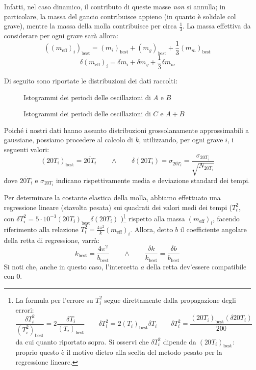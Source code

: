 \documentclass{article}
\newcommand*{\best}[1]{{#1}_\text{best}}
\begin{document}
Infatti, nel caso dinamico, il contributo di queste masse
\emph{non} si annulla; in particolare, la massa del gancio
contribuisce appieno (in quanto è solidale col grave),
mentre la massa della molla contribuisce per circa
$\frac{1}{3}$. La massa effettiva da considerare per ogni grave
sarà allora:
\[\best{\left(\left(m_\text{eff}\right)_i\right)} = \best{\left(m_i\right)} + \best{\left(m_g\right)} + \frac{1}{3}\best{\left(m_m\right)}\]
\[\delta \left(m_\text{eff}\right)_i = \delta m_i + \delta m_g + \frac{1}{3}\delta m_m\]

Di seguito sono riportate le distribuzioni dei dati raccolti:

\begin{figure}[H]
    \caption{Istogrammi dei periodi delle oscillazioni di $A$ e $B$}
\end{figure}\begin{figure}[H]
    \caption{Istogrammi dei periodi delle oscillazioni di $C$ e $A+B$}
\end{figure}

Poiché i nostri dati hanno assunto distribuzioni grossolanamente
approssimabili a gaussiane, possiamo procedere al calcolo di $k$,
utilizzando, per ogni grave $i$, i seguenti valori:
\[
    \left(20T_i\right)_\text{best} = \overline{20T_i}
    \qquad\wedge\qquad
    \delta\left(20T_i\right) =
    \sigma_{\overline{20T_i}} =
    \frac{\sigma_{20T_i}}{\sqrt{N_{20T_i}}}
\]
dove $\overline{20T_i}$ e $\sigma_{20T_i}$ indicano rispettivamente
media e deviazione standard dei tempi.

Per determinare la costante elastica della molla, abbiamo effettuato
una regressione lineare (stavolta pesata) sui quadrati dei valori medi
dei tempi ($T_i^2$, con
$\delta T_i^2 = 5 \cdot 10^{-3} (20 T_i)_\text{best} \delta(20 T_i)$
)\footnote[2]{
    La formula per l'errore su $T_i^2$ segue direttamente dalla
    propagazione degli errori:
    \[
        \frac{\delta T_i^2}{\left(T_i^2\right)_\text{best}} = 2\frac{\delta T_i}{{\left(T_i\right)}_\text{best}}
        \qquad
        \delta T_i^2 = 2\left(T_i\right)_\text{best}\delta T_i
        \qquad
        \delta T_i^2 = \frac{\left(20T_i\right)_\text{best}(\delta 20T_i)}{200}
    \]
    da cui quanto riportato sopra.
    Si osservi che $\delta T_i^2$ dipende da
    $\left(20T_i\right)_\text{best}$:
    proprio questo è il motivo dietro alla scelta del metodo pesato
    per la regressione lineare.
} rispetto alla massa $\left(m_\text{eff}\right)_i$, facendo riferimento
alla relazione $T_i^2 = \frac{4\pi^2}{k} \left(m_\text{eff}\right)_i$. Allora, detto $b$ il
coefficiente angolare della retta di regressione, varrà:
\[
    k_\text{best}=\frac{4\pi^2}{b_\text{best}}
    \qquad\wedge\qquad
    \frac{\delta k}{k_\text{best}}=\frac{\delta b}{b_\text{best}}
\]
Si noti che, anche in questo caso, l'intercetta $a$ della retta dev'essere
compatibile con $0$.
\end{document}
